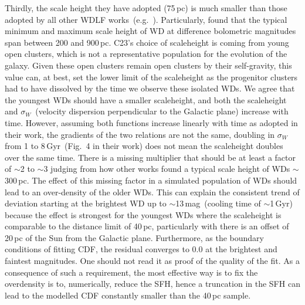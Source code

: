 \documentclass[fleqn,usenatbib]{mnras}
\begin{document}
Thirdly, the scale height they have adopted (75\,pc) is much smaller than those
adopted by all other WDLF works~(e.g.\ \citealt{2006AJ....131..571H,
2011MNRAS.417...93R, 2019MNRAS.482..715L}). Particularly,
\citet{2006AJ....131..571H} found that the typical minimum and maximum scale
height of WD at difference bolometric magnitudes span between 200 and 900\,pc.
C23's choice of scaleheight is coming from young open clusters, which is not
a representative population for the evolution of the galaxy. Given these open
clusters remain open clusters by their self-gravity, this value can, at best,
set the lower limit of the scaleheight as the progenitor clusters had to have
dissolved by the time we observe these isolated WDs. We agree that the youngest
WDs should have a smaller scaleheight, and both the scaleheight and
$\sigma_W$~(velocity dispersion perpendicular to the Galactic plane) increase
with time. However, assuming both functions increase linearly with time as
adopted in their work, the gradients of the two relations are not the same,
doubling in $\sigma_W$ from 1 to 8\,Gyr~(Fig.~4 in their work) does not mean
the scaleheight doubles over the same time. There is a missing multiplier
that should be at least a factor of $\sim$2 to $\sim$3 judging from how other 
works found a typical scale height of WDs $\sim$300\,pc. The effect of this 
missing factor in a simulated population of WDs should lead to an over-density
of the older WDs. This can explain the consistent trend of deviation starting
at the brightest WD up to $\sim$13\,mag~(cooling time of $\sim$1\,Gyr) because
the effect is strongest for the youngest WDs where the scaleheight is
comparable to the distance limit of 40\,pc, particularly with there is an
offset of 20\,pc of the Sun from the Galactic plane. Furthermore, as the
boundary conditions of fitting CDF, the residual converges to 0.0 at the
brightest and faintest magnitudes. One should not read it as proof of the
quality of the fit. As a consequence of such a requirement, the most effective
way is to fix the overdensity is to, numerically, reduce the SFH, hence a
truncation in the SFH can lead to the modelled CDF constantly smaller than the
40\,pc sample.


\end{document}
